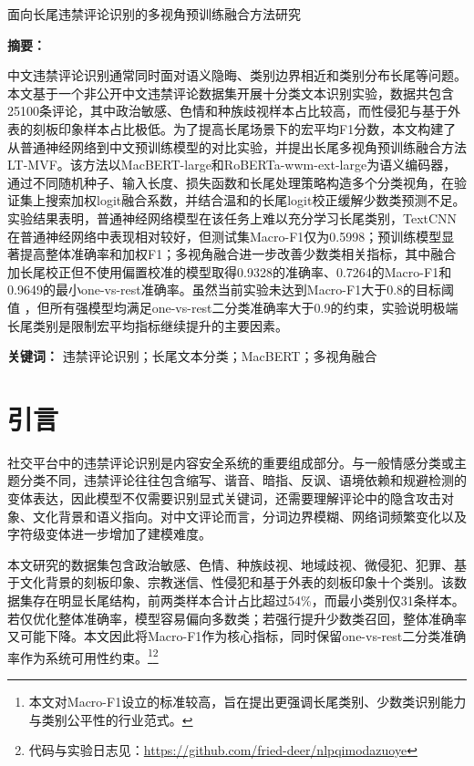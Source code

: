 \documentclass[UTF8, fontset=windows]{ctexart}
\renewenvironment{abstract}{
	\par\addvspace{1.5em}
	\noindent\hspace{2em}\textbf{\heiti 摘要：}
	\bgroup\kaishu \ignorespaces
}{
	\egroup \par\addvspace{0.5em}
}
\newcommand{\keywords}[1]{
	\noindent\hspace{2em}\textbf{\heiti 关键词：}
	\bgroup\kaishu #1\egroup
}
\begin{document}
	
	\begin{center}
		\heiti 面向长尾违禁评论识别的多视角预训练融合方法研究
	\end{center}
	
	\begin{abstract}
		中文违禁评论识别通常同时面对语义隐晦、类别边界相近和类别分布长尾等问题。本文基于一个非公开中文违禁评论数据集开展十分类文本识别实验，数据共包含25100条评论，其中政治敏感、色情和种族歧视样本占比较高，而性侵犯与基于外表的刻板印象样本占比极低。为了提高长尾场景下的宏平均F1分数，本文构建了从普通神经网络到中文预训练模型的对比实验，并提出长尾多视角预训练融合方法LT-MVF。该方法以MacBERT-large和RoBERTa-wwm-ext-large为语义编码器，通过不同随机种子、输入长度、损失函数和长尾处理策略构造多个分类视角，在验证集上搜索加权logit融合系数，并结合温和的长尾logit校正缓解少数类预测不足。实验结果表明，普通神经网络模型在该任务上难以充分学习长尾类别，TextCNN在普通神经网络中表现相对较好，但测试集Macro-F1仅为0.5998；预训练模型显著提高整体准确率和加权F1；多视角融合进一步改善少数类相关指标，其中融合加长尾校正但不使用偏置校准的模型取得0.9328的准确率、0.7264的Macro-F1和0.9649的最小one-vs-rest准确率。虽然当前实验未达到Macro-F1大于0.8的目标阈值 ，但所有强模型均满足one-vs-rest二分类准确率大于0.9的约束，实验说明极端长尾类别是限制宏平均指标继续提升的主要因素。
	\end{abstract}
	
	\keywords{违禁评论识别；长尾文本分类；MacBERT；多视角融合}
	
	\section{引言}
	
	社交平台中的违禁评论识别是内容安全系统的重要组成部分。与一般情感分类或主题分类不同，违禁评论往往包含缩写、谐音、暗指、反讽、语境依赖和规避检测的变体表达，因此模型不仅需要识别显式关键词，还需要理解评论中的隐含攻击对象、文化背景和语义指向。对中文评论而言，分词边界模糊、网络词频繁变化以及字符级变体进一步增加了建模难度。
	
	本文研究的数据集包含政治敏感、色情、种族歧视、地域歧视、微侵犯、犯罪、基于文化背景的刻板印象、宗教迷信、性侵犯和基于外表的刻板印象十个类别。该数据集存在明显长尾结构，前两类样本合计占比超过54\%，而最小类别仅31条样本。若仅优化整体准确率，模型容易偏向多数类；若强行提升少数类召回，整体准确率又可能下降。本文因此将Macro-F1作为核心指标，同时保留one-vs-rest二分类准确率作为系统可用性约束。\footnote{本文对Macro-F1设立的标准较高，旨在提出更强调长尾类别、少数类识别能力与类别公平性的行业范式。}\footnote{代码与实验日志见：\url{https://github.com/fried-deer/nlpqimodazuoye}}
	
\end{document}
